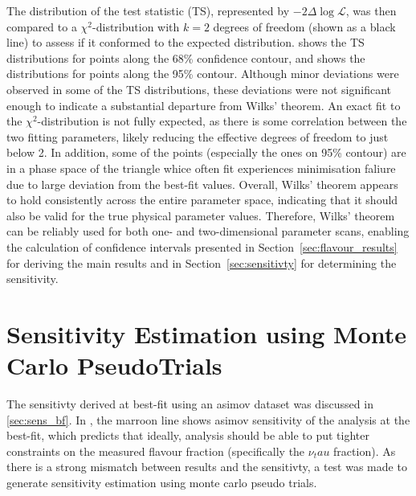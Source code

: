 The distribution of the test statistic (TS), represented by \(-2 \Delta \log \mathcal{L}\), was then compared to a \(\chi^2\)-distribution with \(k=2\) degrees of freedom (shown as a black line) to assess if it conformed to the expected distribution.  shows the TS distributions for points along the 68\% confidence contour, and  shows the distributions for points along the 95\% contour. Although minor deviations were observed in some of the TS distributions, these deviations were not significant enough to indicate a substantial departure from Wilks' theorem. An exact fit to the \(\chi^2\)-distribution is not fully expected, as there is some correlation between the two fitting parameters, likely reducing the effective degrees of freedom to just below 2. In addition, some of the points (especially the ones on 95\% contour) are in a phase space of the triangle whice often fit experiences minimisation faliure due to large deviation from the best-fit values. Overall, Wilks' theorem appears to hold consistently across the entire parameter space, indicating that it should also be valid for the true physical parameter values. Therefore, Wilks' theorem can be reliably used for both one- and two-dimensional parameter scans, enabling the calculation of confidence intervals presented in Section~\ref{sec:flavour_results} for deriving the main results and in Section~\ref{sec:sensitivty} for determining the sensitivity.


\chapter{Sensitivity Estimation using Monte Carlo PseudoTrials}
\label{ch:sensitivity_checks}
The sensitivty derived at best-fit using an asimov dataset  was discussed in \ref{sec:sens_bf}. In , the marroon line shows asimov sensitivity of the analysis at the best-fit, which predicts that ideally, analysis should be able to put tighter constraints on the measured flavour fraction (specifically the $\nu_tau$ fraction). As there is a strong mismatch between results and the sensitivty, a test was made to generate sensitivity estimation using monte carlo pseudo trials.


